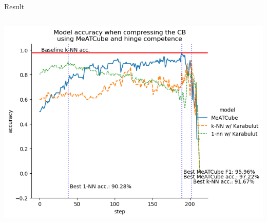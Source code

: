 \documentclass[]{beamer}
\begin{document}
\begin{frame}{Result}
\begin{columns}
\begin{column}{.65\textwidth}
            \includegraphics[width=.8\textwidth]{../results-weight-estim+/figs/dermatology.png}
        \end{column}
    \end{columns}
\end{frame}
\end{document}
